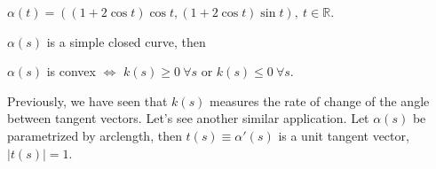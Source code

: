 \begin{example}
    $\alpha(t)=\left((1+2\cos t)\cos t,(1+2\cos t)\sin t\right),
    ~ t\in \mathbb{R}.$

    \begin{center}
    \end{center}

\end{example}
\begin{proposition}
    \label{week3_prop2}
    $\alpha(s)$ is a simple closed curve, then
    \begin{center}
        $\alpha(s)$ is convex $\Leftrightarrow $ $k(s)\ge 0~\forall s$ or $k(s)\le 0~\forall s$.
    \end{center}
\end{proposition}
Previously, we have seen that $k(s)$ measures the rate of change
of the angle between tangent vectors. Let's see another similar application.
Let $\alpha(s)$ be parametrized by arclength, then $t(s)\equiv\alpha'(s)$
is a unit tangent vector, \ie\ $|t(s)|=1$.

